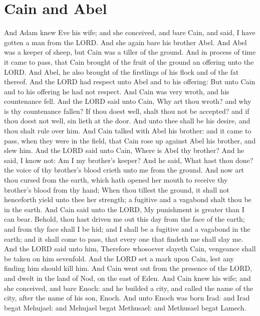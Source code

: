 \section*{Cain and Abel}
\begin{biblechapter} %
\verse And Adam knew Eve his wife; and she conceived, and bare Cain, and said, I have gotten a man from the LORD.
\verse And she again bare his brother Abel. And Abel was a keeper of sheep, but Cain was a tiller of the ground.
\verse And in process of time it came to pass, that Cain brought of the fruit of the ground an offering unto the LORD.
\verse And Abel, he also brought of the firstlings of his flock and of the fat thereof. And the LORD had respect unto Abel and to his offering:
\verse But unto Cain and to his offering he had not respect. And Cain was very wroth, and his countenance fell.
\verse And the LORD said unto Cain, Why art thou wroth? and why is thy countenance fallen?
\verse If thou doest well, shalt thou not be accepted? and if thou doest not well, sin lieth at the door. And unto thee shall be his desire, and thou shalt rule over him.
\verse And Cain talked with Abel his brother: and it came to pass, when they were in the field, that Cain rose up against Abel his brother, and slew him.
\verse And the LORD said unto Cain, Where is Abel thy brother? And he said, I know not: Am I my brother's keeper?
\verse And he said, What hast thou done? the voice of thy brother's blood crieth unto me from the ground.
\verse And now art thou cursed from the earth, which hath opened her mouth to receive thy brother's blood from thy hand;
\verse When thou tillest the ground, it shall not henceforth yield unto thee her strength; a fugitive and a vagabond shalt thou be in the earth.
\verse And Cain said unto the LORD, My punishment is greater than I can bear.
\verse Behold, thou hast driven me out this day from the face of the earth; and from thy face shall I be hid; and I shall be a fugitive and a vagabond in the earth; and it shall come to pass, that every one that findeth me shall slay me.
\verse And the LORD said unto him, Therefore whosoever slayeth Cain, vengeance shall be taken on him sevenfold. And the LORD set a mark upon Cain, lest any finding him should kill him.
\verse And Cain went out from the presence of the LORD, and dwelt in the land of Nod, on the east of Eden.
\verse And Cain knew his wife; and she conceived, and bare Enoch: and he builded a city, and called the name of the city, after the name of his son, Enoch.
\verse And unto Enoch was born Irad: and Irad begat Mehujael: and Mehujael begat Methusael: and Methusael begat Lamech.

\end{biblechapter}
